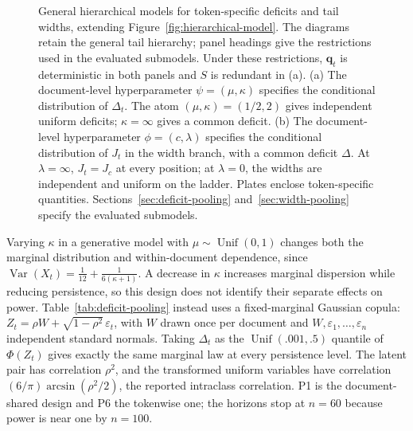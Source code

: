 \documentclass[11pt]{article}
\newcommand{\bP}{\bm p}
\newcommand{\Unif}{\operatorname{Unif}}
\begin{document}
\begin{figure}[t]
\begin{minipage}[t]{0.48\textwidth}
\end{minipage}
\caption{General hierarchical models for token-specific deficits and tail widths, extending Figure~\ref{fig:hierarchical-model}.  The diagrams retain the general tail hierarchy; panel headings give the restrictions used in the evaluated submodels.  Under these restrictions, $\bm q_t$ is deterministic in both panels and $S$ is redundant in (a).  (a) The document-level hyperparameter $\psi=(\mu,\kappa)$ specifies the conditional distribution of $\Delta_t$.  The atom $(\mu,\kappa)=(1/2,2)$ gives independent uniform deficits; $\kappa=\infty$ gives a common deficit.  (b) The document-level hyperparameter $\phi=(c,\lambda)$ specifies the conditional distribution of $J_t$ in the width branch, with a common deficit $\Delta$.  At $\lambda=\infty$, $J_t=J_c$ at every position; at $\lambda=0$, the widths are independent and uniform on the ladder.  Plates enclose token-specific quantities.  Sections~\ref{sec:deficit-pooling} and~\ref{sec:width-pooling} specify the evaluated submodels.}
\label{fig:pooling-model}
\end{figure}

Varying $\kappa$ in a generative model with $\mu\sim\Unif(0,1)$ changes both the
marginal distribution and within-document dependence, since
$\operatorname{Var}(X_t)=\tfrac1{12}+\tfrac1{6(\kappa+1)}$.  A decrease in $\kappa$
increases marginal dispersion while reducing persistence, so this design does
not identify their separate effects on power.  Table~\ref{tab:deficit-pooling}
instead uses a fixed-marginal
Gaussian copula: $Z_t=\rho W+\sqrt{1-\rho^2}\,\varepsilon_t$, with $W$ drawn once per
document and $W,\varepsilon_1,\ldots,\varepsilon_n$ independent standard normals.
Taking $\Delta_t$ as the $\Unif(.001,.5)$ quantile of $\Phi(Z_t)$ gives exactly the
same marginal law at every persistence level.  The latent pair has correlation
$\rho^2$, and the transformed uniform variables have correlation
$(6/\pi)\arcsin(\rho^2/2)$, the reported intraclass correlation.
P1 is the document-shared design and P6 the tokenwise one; the horizons stop at
$n=60$ because power is near one by $n=100$.
\end{document}
